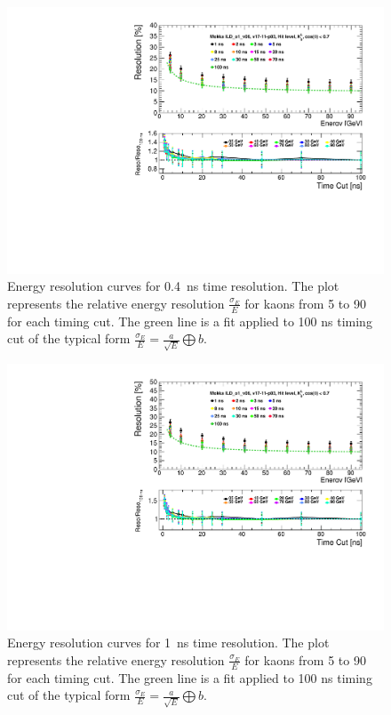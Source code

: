 \begin{figure}[htbp!]
  \centering
  \includegraphics[width=0.7\linewidth]{../Thesis_Plots/ILD/Smearing_0.4ns/Plots/ShowerResoAbsolute_TimeCuts_Smearing1}
  \caption{Energy resolution curves for \SI{0.4}{\nano\second} time resolution. The plot represents the relative energy resolution $\frac{\sigma_{E}}{E}$ for kaons from 5 to 90 \GeV for each timing cut. The green line is a fit applied to 100 ns timing cut of the typical form $\frac{\sigma_{E}}{E} = \frac{a}{\sqrt{E}} \bigoplus b$.} \label{fig:Reso0.4ns}
\end{figure}

\begin{figure}[htbp!]
  \centering
  \includegraphics[width=0.7\linewidth]{../Thesis_Plots/ILD/Smearing_1ns/Plots/ShowerResoAbsolute_TimeCuts_Smearing2}
  \caption{Energy resolution curves for \SI{1}{\nano\second} time resolution. The plot represents the relative energy resolution $\frac{\sigma_{E}}{E}$ for kaons from 5 to 90 \GeV for each timing cut. The green line is a fit applied to 100 ns timing cut of the typical form $\frac{\sigma_{E}}{E} = \frac{a}{\sqrt{E}} \bigoplus b$.} \label{fig:Reso1ns}
\end{figure}

